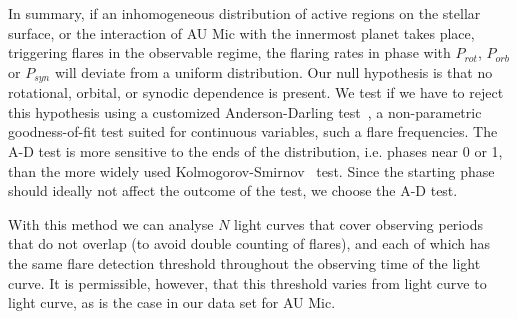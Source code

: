 \documentclass[fleqn,usenatbib]{mnras}%
\begin{document}
In summary, if an inhomogeneous distribution of active regions on the stellar surface, or the interaction of AU Mic with the innermost planet takes place, triggering flares in the observable regime, the flaring rates in phase with $P_{rot}$, $P_{orb}$ or $P_{syn}$  will deviate from a uniform distribution. Our null hypothesis is that no rotational, orbital, or synodic dependence is present. We test if we have to reject this hypothesis using a customized Anderson-Darling test~\citep[\mbox{A-D} test,][]{anderson1952, stephens1974edf}, a non-parametric goodness-of-fit test suited for continuous variables, such a flare frequencies. The \mbox{A-D} test is more sensitive to the ends of the distribution, i.e. phases near 0 or 1, than the more widely used Kolmogorov-Smirnov~\citep{kolmogorov1933sulla,smirnov1948table} test. Since the starting phase should ideally not affect the outcome of the test, we choose the \mbox{A-D} test.

With this method we can analyse $N$ light curves that cover observing periods that do not overlap (to avoid double counting of flares), and each of which has the same flare detection threshold throughout the observing time of the light curve. It is permissible, however, that this threshold varies from light curve to light curve, as is the case in our data set for AU Mic.
 
\end{document}
